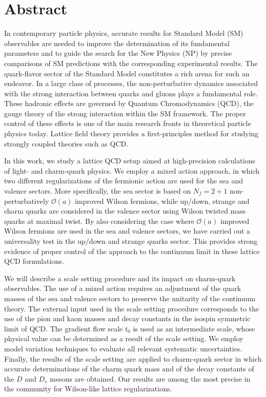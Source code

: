 \begingroup
\let\clearpage\relax
\let\cleardoublepage\relax
\let\cleardoublepage\relax

\chapter*{Abstract}

In contemporary particle physics, accurate results for Standard Model (SM) observables are needed to improve the determination of its fundamental parameters and to guide the search for the New Physics (NP) by precise comparisons of SM predictions with the corresponding  experimental results. The quark-flavor sector of the Standard Model constitutes a rich arena for such an endeavor. In a large class of processes, the non-perturbative dynamics associated with the strong interaction between quarks and gluons plays a fundamental role. These hadronic effects are governed by Quantum Chromodynamics (QCD), the gauge theory of the strong interaction within the SM framework. The proper control of these effects is one of the main research fronts in theoretical particle physics today. Lattice field theory provides a first-principles method for studying strongly coupled theories such as QCD.

In this work, we study a lattice QCD setup aimed at high-precision calculations of light- and charm-quark physics. We employ a mixed action approach, in which two different regularizations of the fermionic action are used for the sea and valence sectors. More specifically, the sea sector is based on $N_f = 2 + 1$ non-perturbatively $\mathcal{O}(a)$ improved Wilson fermions, while up/down, strange and charm quarks are considered in the valence sector using  Wilson twisted mass quarks at maximal twist. By also considering the case where $\mathcal{O}(a)$ improved Wilson fermions are used in the sea and valence sectors, we have carried out a universality test in the up/down and strange quarks sector. This provides strong evidence of proper control of the approach to the continuum limit in these lattice QCD formulations.

We will describe a scale setting procedure and its impact on charm-quark observables. The use of a mixed action requires an adjustment of the quark masses of the sea and valence sectors to preserve the unitarity of the continuum theory. The external input used in the scale setting procedure corresponds to the use of the pion and kaon masses and decay constants in the isospin symmetric limit of QCD. The gradient flow scale $t_0$ is used as an intermediate scale, whose physical value can  be determined as a result of the scale setting. We employ model variation techniques to evaluate all relevant systematic uncertainties. Finally, the results of the scale setting are applied to  charm-quark sector in which accurate determinations of the charm quark mass and of the decay constants of the $D$ and $D_s$ mesons are obtained. Our results are among the most precise in the community for Wilson-like lattice regularizations.

